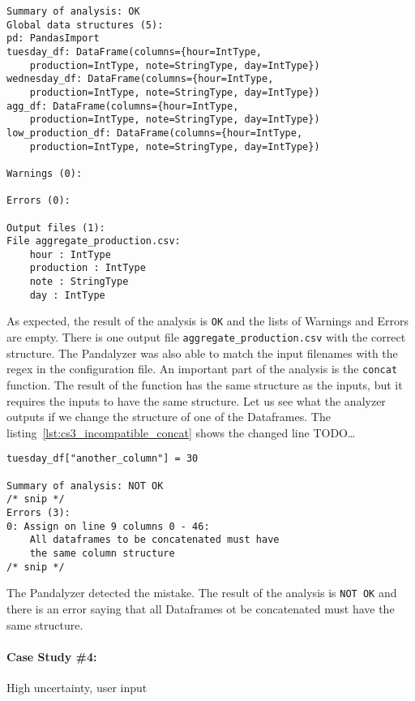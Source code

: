 \begin{lstlisting}[caption=Analysis output of the third case study, label={lst:cs3_analysis_output}, captionpos=b]
Summary of analysis: OK
Global data structures (5):
pd: PandasImport
tuesday_df: DataFrame(columns={hour=IntType,
    production=IntType, note=StringType, day=IntType})
wednesday_df: DataFrame(columns={hour=IntType,
    production=IntType, note=StringType, day=IntType})
agg_df: DataFrame(columns={hour=IntType,
    production=IntType, note=StringType, day=IntType})
low_production_df: DataFrame(columns={hour=IntType,
    production=IntType, note=StringType, day=IntType})

Warnings (0):

Errors (0):

Output files (1):
File aggregate_production.csv:
    hour : IntType
    production : IntType
    note : StringType
    day : IntType
\end{lstlisting}

As expected, the result of the analysis is \verb|OK| and the lists of Warnings and Errors are empty.
There is one output file \verb|aggregate_production.csv| with the correct structure.
The Pandalyzer was also able to match the input filenames with the regex in the configuration file.
An important part of the analysis is the \verb|concat| function.
The result of the function has the same structure as the inputs, but it requires the inputs to have the same structure.
Let us see what the analyzer outputs if we change the structure of one of the Dataframes.
The listing~\ref{lst:cs3_incompatible_concat} shows the changed line TODO\ldots

\begin{lstlisting}[caption=Incompatible Dataframes to concat operation and analysis output, label={lst:cs3_incompatible_concat}, captionpos=b]
tuesday_df["another_column"] = 30

Summary of analysis: NOT OK
/* snip */
Errors (3):
0: Assign on line 9 columns 0 - 46:
    All dataframes to be concatenated must have
    the same column structure
/* snip */
\end{lstlisting}

The Pandalyzer detected the mistake.
The result of the analysis is \verb|NOT OK| and there is an error saying that all Dataframes ot be concatenated must
have the same structure.


\paragraph{Case Study \#4:} High uncertainty, user input \\

